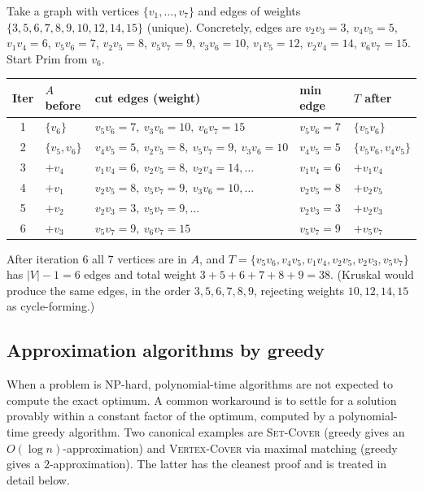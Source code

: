 \begin{example}
\label{ex:mst_run}
Take a graph with vertices $\{v_1, \dots, v_7\}$ and edges of weights $\{3, 5, 6, 7, 8, 9, 10, 12, 14, 15\}$ (unique). Concretely, edges are $v_2v_3=3$, $v_4v_5=5$, $v_1v_4=6$, $v_5v_6=7$, $v_2v_5=8$, $v_5v_7=9$, $v_3v_6=10$, $v_1v_5=12$, $v_2v_4=14$, $v_6v_7=15$. Start Prim from $v_6$.

\medskip
\renewcommand{\arraystretch}{1.15}
\begin{tabular}{cllll}
\toprule
Iter & $A$ before & cut edges (weight) & min edge & $T$ after \\
\midrule
1 & $\{v_6\}$       & $v_5v_6=7,\ v_3v_6=10,\ v_6v_7=15$           & $v_5v_6=7$  & $\{v_5v_6\}$ \\
2 & $\{v_5,v_6\}$   & $v_4v_5=5,\ v_2v_5=8,\ v_5v_7=9,\ v_3v_6=10$ & $v_4v_5=5$  & $\{v_5v_6, v_4v_5\}$ \\
3 & $+v_4$          & $v_1v_4=6,\ v_2v_5=8,\ v_2v_4=14,\dots$       & $v_1v_4=6$  & $+ v_1v_4$ \\
4 & $+v_1$          & $v_2v_5=8,\ v_5v_7=9,\ v_3v_6=10,\dots$       & $v_2v_5=8$  & $+ v_2v_5$ \\
5 & $+v_2$          & $v_2v_3=3,\ v_5v_7=9,\dots$                  & $v_2v_3=3$  & $+ v_2v_3$ \\
6 & $+v_3$          & $v_5v_7=9,\ v_6v_7=15$                        & $v_5v_7=9$  & $+ v_5v_7$ \\
\bottomrule
\end{tabular}
\medskip

After iteration $6$ all $7$ vertices are in $A$, and $T = \{v_5v_6, v_4v_5, v_1v_4, v_2v_5, v_2v_3, v_5v_7\}$ has $|V|-1=6$ edges and total weight $3+5+6+7+8+9 = 38$. (Kruskal would produce the same edges, in the order $3, 5, 6, 7, 8, 9$, rejecting weights $10, 12, 14, 15$ as cycle-forming.)
\end{example}

\subsection{Approximation algorithms by greedy}

When a problem is NP-hard, polynomial-time algorithms are not expected to compute the exact optimum. A common workaround is to settle for a solution provably within a constant factor of the optimum, computed by a polynomial-time greedy algorithm. Two canonical examples are \textsc{Set-Cover} (greedy gives an $O(\log n)$-approximation) and \textsc{Vertex-Cover} via maximal matching (greedy gives a $2$-approximation). The latter has the cleanest proof and is treated in detail below.

